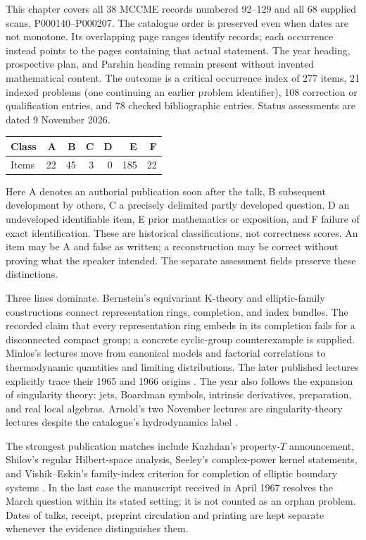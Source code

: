 This chapter covers all 38 MCCME records numbered 92--129 and all 68 supplied scans, P000140--P000207. The catalogue order is preserved even when dates are not monotone. Its overlapping page ranges identify records; each occurrence instead points to the pages containing that actual statement. The year heading, prospective plan, and Parshin heading remain present without invented mathematical content. The outcome is a critical occurrence index of 277 items, 21 indexed problems (one continuing an earlier problem identifier), 108 correction or qualification entries, and 78 checked bibliographic entries. Status assessments are dated 9 November 2026.

\begin{center}
\begin{tabular}{lrrrrrr}
\toprule
Class & A & B & C & D & E & F\\
\midrule
Items & 22 & 45 & 3 & 0 & 185 & 22\\
\bottomrule
\end{tabular}
\end{center}
Here A denotes an authorial publication soon after the talk, B subsequent development by others, C a precisely delimited partly developed question, D an undeveloped identifiable item, E prior mathematics or exposition, and F failure of exact identification. These are historical classifications, not correctness scores. An item may be A and false as written; a reconstruction may be correct without proving what the speaker intended. The separate assessment fields preserve these distinctions.

Three lines dominate. Bernstein’s equivariant K-theory and elliptic-family constructions connect representation rings, completion, and index bundles. The recorded claim that every representation ring embeds in its completion fails for a disconnected compact group; a concrete cyclic-group counterexample is supplied. Minlos’s lectures move from canonical models and factorial correlations to thermodynamic quantities and limiting distributions. The later published lectures explicitly trace their 1965 and 1966 origins \citep[Introduction]{minlos1968lectures}. The year also follows the expansion of singularity theory: jets, Boardman symbols, intrinsic derivatives, preparation, and real local algebras. Arnold’s two November lectures are singularity-theory lectures despite the catalogue’s hydrodynamics label \citep{arnold1968singularities,boardman1967singularities}.

The strongest publication matches include Kazhdan’s property-\(T\) announcement, Shilov’s regular Hilbert-space analysis, Seeley’s complex-power kernel statements, and Vishik--Eskin’s family-index criterion for completion of elliptic boundary systems \citep{kazhdan1967dual,shilov1967hilbert1,seeley1968powers,vishikeskin1967normally}. In the last case the manuscript received in April 1967 resolves the March question within its stated setting; it is not counted as an orphan problem. Dates of talks, receipt, preprint circulation and printing are kept separate whenever the evidence distinguishes them.

